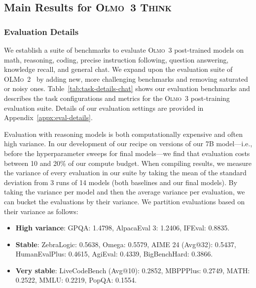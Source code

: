 \documentclass[table]{ai2style/ai2}
\newcommand{\oldOlmo}{OLMo\xspace}
\newcommand{\newOlmo}{Olmo\xspace}
\newcommand{\olmotoo}{\textsc{\oldOlmo~2}\xspace}
\newcommand{\olmothree}{\textsc{\newOlmo~3}\xspace}
\newcommand{\olmothreethinking}{\textsc{Olmo~3 Think}\xspace}
\begin{document}
\subsection{Main Results for \olmothreethinking}
\label{sec:posttrain_eval}

\subsubsection{Evaluation Details}
We establish a suite of benchmarks to evaluate \olmothree post-trained models on math, reasoning, coding, precise instruction following, question answering, knowledge recall, and general chat. We expand upon the evaluation suite of \olmotoo~\citep{olmo20242olmo2furious} by adding new, more challenging benchmarks and removing saturated or noisy ones. 
Table~\ref{tab:task-details-chat} shows our evaluation benchmarks and describes the task configurations and metrics for the \olmothree post-training evaluation suite. 
Details of our evaluation settings are provided in Appendix~\ref{appx:eval-details}.

Evaluation with reasoning models is both computationally expensive and often high variance.
In our development of our recipe on versions of our 7B model---i.e., before the hyperparameter sweeps for final models---we find that evaluation costs between 10 and 20\% of our compute budget.
When compiling results, we measure the variance of every evaluation in our suite by taking the mean of the standard deviation from 3 runs of 14 models (both baselines and our final models).
By taking the variance per model and then the average variance per evaluation, we can bucket the evaluations by their variance.
We partition evaluations based on their variance as follows:
\begin{itemize}
    \item {\bf{High variance}}:
GPQA: 1.4798,
AlpacaEval 3: 1.2406,
IFEval: 0.8835.
\item {\bf{Stable}}:
ZebraLogic: 0.5638,
Omega: 0.5579,
AIME 24 (Avg@32): 0.5437,
HumanEvalPlus: 0.4615,
AgiEval: 0.4339,
BigBenchHard: 0.3866.
\item {\bf{Very stable}}:
LiveCodeBench (Avg@10): 0.2852,
MBPPPlus: 0.2749,
MATH: 0.2522,
MMLU: 0.2219,
PopQA: 0.1554.
\end{itemize}
\end{document}
